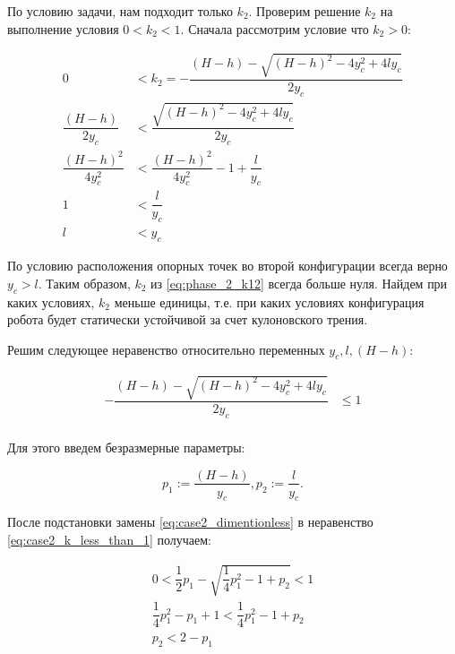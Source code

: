 По условию задачи, нам подходит только $k_2$. Проверим решение $k_2$ на выполнение условия $0 < k_2 < 1$. Сначала рассмотрим условие что $k_2 > 0$:


\[
\begin{alignedat}{3}
\label{eq:case2_greater_than_zero}
0 &< k_2 = - \dfrac{(H - h) - \sqrt{(H-h)^2 - 4y_c^2+4ly_c}}{2y_c} \\
\dfrac{(H-h)}{2y_c} &< \dfrac{\sqrt{(H-h)^2 - 4y_c^2+4ly_c}}{2y_c}\\
\dfrac{(H-h)^2}{4y_c^2} &< \dfrac{(H-h)^2}{4y_c^2} - 1 + \dfrac{l}{y_c}\\
1 &< \dfrac{l}{y_c}\\
l &< y_c
\end{alignedat}
\]

По условию расположения опорных точек во второй конфигурации всегда верно $y_c > l$. Таким образом, $k_2$ из \ref{eq:phase_2_k12} всегда больше нуля. Найдем при каких условиях, $k_2$ меньше единицы, т.е. при каких условиях конфигурация робота будет статически устойчивой за счет кулоновского трения.

Решим следующее неравенство относительно переменных $y_c, l, (H-h)$:

\begin{equation}
\label{eq:case2_k_less_than_1}
\begin{alignedat}{3}
 - \dfrac{(H - h) - \sqrt{(H-h)^2 - 4y_c^2+4ly_c}}{2y_c}  & \leq 1 \\
\end{alignedat}
\end{equation}

Для этого введем безразмерные параметры:

\begin{equation}
\label{eq:case2_dimentionless}
p_1 := \dfrac{(H-h)}{y_c}, p_2 := \dfrac{l}{y_c}.
\end{equation}

После подстановки замены \ref{eq:case2_dimentionless} в неравенство \ref{eq:case2_k_less_than_1} получаем:

\begin{equation}
\label{eq:case2_k_less_one}
\begin{alignedat}{3}
  0 < \dfrac{1}{2}p_1 - \sqrt{\dfrac{1}{4}p_1^2 - 1 + p_2} < 1\\
  \dfrac{1}{4}p_1^2 - p_1 + 1 < \dfrac{1}{4}p_1^2 - 1 + p_2 \\
  p_2 < 2 - p_1\\
\end{alignedat}
\end{equation}


